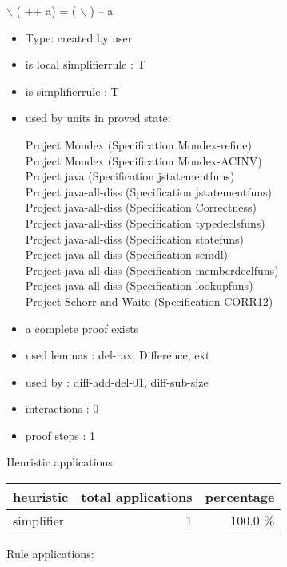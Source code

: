 \documentclass[a4paper]{article}
\begin{document}
 \Fol {} $\backslash$ ( ++ a) = ( $\backslash$ ) -- a

\begin{itemize}

\item Type: created by user

\item is local simplifierrule : T
\item is simplifierrule : T
\item used by units in proved state:

Project Mondex (Specification Mondex-refine) \\
Project Mondex (Specification Mondex-ACINV) \\
Project java (Specification jstatementfuns) \\
Project java-all-diss (Specification jstatementfuns) \\
Project java-all-diss (Specification Correctness) \\
Project java-all-diss (Specification typedeclsfuns) \\
Project java-all-diss (Specification statefuns) \\
Project java-all-diss (Specification semdl) \\
Project java-all-diss (Specification memberdeclfuns) \\
Project java-all-diss (Specification lookupfuns) \\
Project Schorr-and-Waite (Specification CORR12)
\item       a complete proof exists
\item       used lemmas  : del-rax, Difference, ext
\item       used by      : diff-add-del-01, diff-sub-size
\item       interactions : 0
\item       proof steps  : 1
\end{itemize}

\medskip


Heuristic applications:

\begin{supertabular}{l|r|r}
heuristic	& total applications & percentage \\ \hline
simplifier & 1 & 100.0 \% \\

\end{supertabular}

Rule applications:
\end{document}
